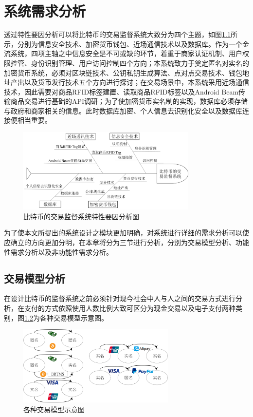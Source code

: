 \chapter{系统需求分析}

透过特性要因分析可以将比特币的交易监督系统大致分为四个主题，如图\ref{fish1}所示，分别为信息安全技术、加密货币钱包、近场通信技术以及数据库。作为⼀个⾦流系统，四项主轴之中信息安全是不可或缺的环节，着重于商家认证机制、用户权限控管、身份识别管理、用户访问控制四个方向；本系统致力于奠定匿名对实名的加密货币系统，必须对区块链技术、公钥私钥生成算法、点对点交易技术、钱包地址产出以及货币发行技术五个方向进行探讨；在交易场景中，本系统采用近场通信技术，因此需要对商品RFID标签建置、读取商品RFID标签以及Android Beam传输商品交易进行基础的API调研；为了使加密货币实名制的实现，数据库必须存储与政府和商家相关的信息。此时数据库加密、个人信息去识别化安全以及数据库连接便相当重要。
		\begin{figure}[!htbp]
			\centering
			\includegraphics[width = 0.8\textwidth]{fish1.png}
			\caption{⽐特币的交易监督系统特性要因分析图}\label{fish1}
		\end{figure}

为了使本⽂所提出的系统设计之模块更加明确，对系统进⾏详细的需求分析可以使应确⽴的⽅向更加分明，在本章将分为三节进行分析，分别为交易模型分析、功能性需求分析以及非功能性需求分析。


\section{交易模型分析}

在设计比特币的监督系统之前必须针对现今社会中人与人之间的交易方式进行分析，在支付的方式依照使用人数比例大致可区分为现金交易以及电子支付两种类别，图\ref{modeall}为各种交易模型示意图。
\begin{figure}[!htbp]
	\centering
	\includegraphics[width = 0.7\textwidth]{modeall.png}
	\caption{各种交易模型示意图}\label{modeall}
\end{figure}

